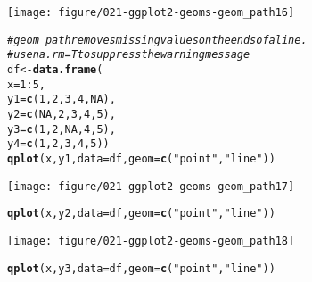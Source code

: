 \documentclass[a4paper,titlepage]{tufte-handout}\usepackage[]{graphicx}\usepackage[]{color}
\makeatletter
\def\maxwidth{ %
  \ifdim\Gin@nat@width>\linewidth
    \linewidth
  \else
    \Gin@nat@width
  \fi
}
\newcommand{\hlnum}[1]{\textcolor[rgb]{0.686,0.059,0.569}{#1}}%
\newcommand{\hlstr}[1]{\textcolor[rgb]{0.192,0.494,0.8}{#1}}%
\newcommand{\hlcom}[1]{\textcolor[rgb]{0.678,0.584,0.686}{\textit{#1}}}%
\newcommand{\hlopt}[1]{\textcolor[rgb]{0,0,0}{#1}}%
\newcommand{\hlstd}[1]{\textcolor[rgb]{0.345,0.345,0.345}{#1}}%
\newcommand{\hlkwb}[1]{\textcolor[rgb]{0.69,0.353,0.396}{#1}}%
\newcommand{\hlkwc}[1]{\textcolor[rgb]{0.333,0.667,0.333}{#1}}%
\newcommand{\hlkwd}[1]{\textcolor[rgb]{0.737,0.353,0.396}{\textbf{#1}}}%
\newenvironment{kframe}{%
 \def\at@end@of@kframe{}%
 \ifinner\ifhmode%
  \def\at@end@of@kframe{\end{minipage}}%
  \begin{minipage}{\columnwidth}%
 \fi\fi%
 \def\FrameCommand##1{\hskip\@totalleftmargin \hskip-\fboxsep
 \colorbox{shadecolor}{##1}\hskip-\fboxsep
     \hskip-\linewidth \hskip-\@totalleftmargin \hskip\columnwidth}%
 \MakeFramed {\advance\hsize-\width
   \@totalleftmargin\z@ \linewidth\hsize
   \@setminipage}}%
 {\par\unskip\endMakeFramed%
 \at@end@of@kframe}
\newenvironment{knitrout}{}{} %
\makeatother
\begin{document}
\begin{knitrout}
\begin{kframe}
\begin{alltt}
\end{alltt}
\end{kframe}
\texttt{[image: figure/021-ggplot2-geoms-geom\_path16]} 
\begin{kframe}\begin{alltt}
\hlcom{# geom_path removes missing values on the ends of a line.}
\hlcom{# use na.rm = T to suppress the warning message}
\hlstd{df} \hlkwb{<-} \hlkwd{data.frame}\hlstd{(}
  \hlkwc{x} \hlstd{=} \hlnum{1}\hlopt{:}\hlnum{5}\hlstd{,}
  \hlkwc{y1} \hlstd{=} \hlkwd{c}\hlstd{(}\hlnum{1}\hlstd{,} \hlnum{2}\hlstd{,} \hlnum{3}\hlstd{,} \hlnum{4}\hlstd{,} \hlnum{NA}\hlstd{),}
  \hlkwc{y2} \hlstd{=} \hlkwd{c}\hlstd{(}\hlnum{NA}\hlstd{,} \hlnum{2}\hlstd{,} \hlnum{3}\hlstd{,} \hlnum{4}\hlstd{,} \hlnum{5}\hlstd{),}
  \hlkwc{y3} \hlstd{=} \hlkwd{c}\hlstd{(}\hlnum{1}\hlstd{,} \hlnum{2}\hlstd{,} \hlnum{NA}\hlstd{,} \hlnum{4}\hlstd{,} \hlnum{5}\hlstd{),}
  \hlkwc{y4} \hlstd{=} \hlkwd{c}\hlstd{(}\hlnum{1}\hlstd{,} \hlnum{2}\hlstd{,} \hlnum{3}\hlstd{,} \hlnum{4}\hlstd{,} \hlnum{5}\hlstd{))}
\hlkwd{qplot}\hlstd{(x, y1,} \hlkwc{data} \hlstd{= df,} \hlkwc{geom} \hlstd{=} \hlkwd{c}\hlstd{(}\hlstr{"point"}\hlstd{,}\hlstr{"line"}\hlstd{))}
\end{alltt}


{\ttfamily\noindent\color{warningcolor}{\#\# Warning: Removed 1 rows containing missing values (geom\_point).\\\#\# Warning: Removed 1 rows containing missing values (geom\_path).}}\end{kframe}
\texttt{[image: figure/021-ggplot2-geoms-geom\_path17]} 
\begin{kframe}\begin{alltt}
\hlkwd{qplot}\hlstd{(x, y2,} \hlkwc{data} \hlstd{= df,} \hlkwc{geom} \hlstd{=} \hlkwd{c}\hlstd{(}\hlstr{"point"}\hlstd{,}\hlstr{"line"}\hlstd{))}
\end{alltt}


{\ttfamily\noindent\color{warningcolor}{\#\# Warning: Removed 1 rows containing missing values (geom\_point).\\\#\# Warning: Removed 1 rows containing missing values (geom\_path).}}\end{kframe}
\texttt{[image: figure/021-ggplot2-geoms-geom\_path18]} 
\begin{kframe}\begin{alltt}
\hlkwd{qplot}\hlstd{(x, y3,} \hlkwc{data} \hlstd{= df,} \hlkwc{geom} \hlstd{=} \hlkwd{c}\hlstd{(}\hlstr{"point"}\hlstd{,}\hlstr{"line"}\hlstd{))}
\end{alltt}



\end{kframe}
\end{knitrout}
\end{document}
